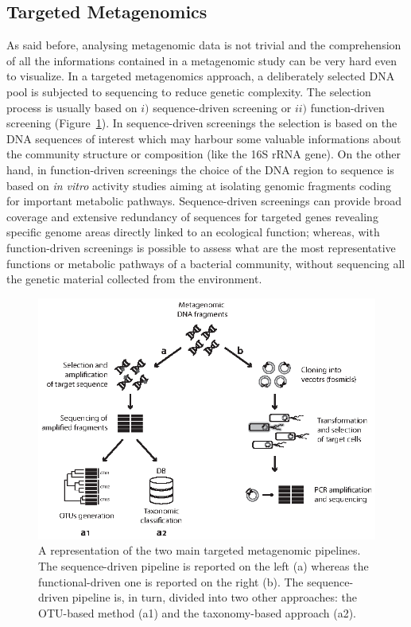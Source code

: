 \subsection{Targeted Metagenomics \label{par:tarmet}}
As said before, analysing metagenomic data is not trivial and the comprehension of all the informations contained in a metagenomic study can be very hard even to visualize. In a targeted metagenomics approach, a deliberately selected DNA pool is subjected to sequencing to reduce genetic complexity. The selection process is usually based on $i)$ sequence-driven screening or $ii)$ function-driven screening (Figure~\ref{fig:tarpipe}). In sequence-driven screenings the selection is based on the DNA sequences of interest which may harbour some valuable informations about the community structure or composition (like the 16S rRNA gene). On the other hand, in function-driven screenings the choice of the DNA region to sequence is based on \textit{in vitro} activity studies aiming at isolating genomic fragments coding for important metabolic pathways. Sequence-driven screenings can provide broad coverage and extensive redundancy of sequences for targeted genes revealing specific genome areas directly linked to an ecological function; whereas, with function-driven screenings is possible to assess what are the most representative functions or metabolic pathways of a bacterial community, without sequencing all the genetic material collected from the environment.\\
\begin{figure}[!tb]
	\centering
	\includegraphics[width=1\textwidth]{./figures/Introduction/targeted_pipeline}
  	\caption{A representation of the two main targeted metagenomic pipelines. The sequence-driven pipeline is reported on the left (a) whereas the functional-driven one is reported on the right (b). The sequence-driven pipeline is, in turn, divided into two other approaches: the OTU-based method (a1) and the taxonomy-based approach (a2).\label{fig:tarpipe}}
\end{figure}

